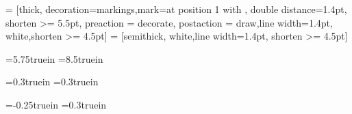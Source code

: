

\usepackage{amsfonts}
\usepackage{amsthm}
\usepackage{amssymb}
\usepackage{amsmath}
\usepackage{enumerate}
\usepackage{fancyhdr}
\usepackage{mathabx}
\usepackage{verbatim}
\usepackage{hyperref}
\hypersetup{                    %
    colorlinks=true,                %
    breaklinks=true,                %
    urlcolor= blue,                 %
    linkcolor= blue,                %
    citecolor= cyan               %
    }


\usepackage{tikz}


\usetikzlibrary{arrows,positioning,decorations.markings} 
 = [thick, decoration={markings,mark=at position
   1 with {}},
   double distance=1.4pt, shorten >= 5.5pt,
   preaction = {decorate},
   postaction = {draw,line width=1.4pt, white,shorten >= 4.5pt}]
 = [semithick, white,line width=1.4pt, shorten >= 4.5pt]


\usepackage[all]{xy}


\textwidth=5.75truein
\textheight=8.5truein



\oddsidemargin=0.3truein
\evensidemargin=0.3truein

\topmargin=-0.25truein
\headheight=13pt
\headsep=0.3truein

